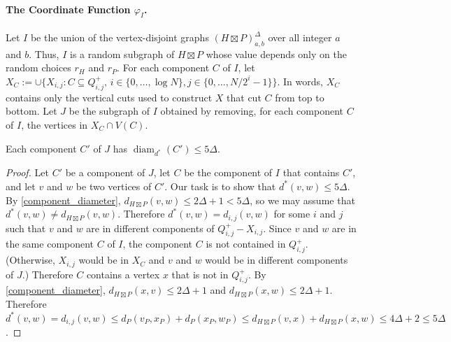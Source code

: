\documentclass{patmorin}
\renewcommand{\le}{\leqslant}
\DeclareMathOperator{\diam}{diam}
\begin{document}
%
%

\paragraph{\boldmath The Coordinate Function $\varphi_I$.}

Let $I$ be the union of the vertex-disjoint graphs $(H\boxtimes P)^\Delta_{a,b}$ over all integer $a$ and $b$.
Thus, $I$ is a random subgraph of $H\boxtimes P$ whose value depends only on the random choices $r_H$ and $r_P$.  For each component $C$ of $I$, let $X_C:=\cup\{X_{i,j}:C\subseteq Q^+_{i,j},\, i\in\{0,\ldots,\log N\}, j\in\{0,\ldots,N/2^i-1\}\}$.  In words, $X_C$ contains only the vertical cuts used to construct $X$ that cut $C$ from top to bottom. Let $J$ be the subgraph of $I$ obtained by removing, for each component $C$ of $I$, the vertices in $X_C\cap V(C)$.

\begin{clm}\label{dstar_component_diameter}
  Each component $C'$ of $J$ has $\diam_{d^*}(C')\le 5\Delta$.
\end{clm}

\begin{proof}
  Let $C'$ be a component of $J$, let $C$ be the component of $I$ that contains $C'$, and let $v$ and $w$ be two vertices of $C'$. Our task is to show that $d^*(v,w)\le 5\Delta$.  By \cref{component_diameter}, $d_{H\boxtimes P}(v,w)\le 2\Delta+1< 5\Delta$, so we may assume that $d^*(v,w)\neq d_{H\boxtimes P}(v,w)$.  Therefore $d^*(v,w)=d_{i,j}(v,w)$ for some $i$ and $j$ such that $v$ and $w$ are in different components of $Q^+_{i,j}-X_{i,j}$.  Since $v$ and $w$ are in the same component $C$ of $I$, the component $C$ is not contained in $Q^+_{i,j}$. (Otherwise, $X_{i,j}$ would be in $X_C$ and $v$ and $w$ would be in different components of $J$.) Therefore $C$ contains a vertex $x$ that is not in $Q^+_{i,j}$.  By \cref{component_diameter}, $d_{H\boxtimes P}(x,v)\le 2\Delta+1$ and $d_{H\boxtimes P}(x,w)\le 2\Delta+1$.  Therefore $d^*(v,w)=d_{i,j}(v,w)\le d_P(v_P,x_P)+d_P(x_P,w_P)\le d_{H\boxtimes P}(v,x)+d_{H\boxtimes P}(x,w)\le 4\Delta+2\le 5\Delta$.
\end{proof}
\end{document}
